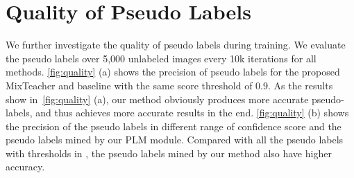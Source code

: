 \documentclass[10pt,twocolumn,letterpaper]{article}
\begin{document}
\begin{table*}[th]
    \centering
    
    \caption{Comparison with state-of-the-art methods on COCO benchmark.  on \texttt{val2017} set are reported.
    Under the {Partially Labeled} setting, results are the average of all five folds and numbers behind  indicate the standard deviation. Under the {Additional} setting, numbers in front of the arrow indicate the supervised baseline. 
    The views of unlabeled image used in each iteration are reported as well.
    }
    \label{tab:sota_coco}
    
\end{table*}



\section{Quality of Pseudo Labels}

We further investigate the quality of pseudo labels during training. We evaluate the pseudo labels over 5,000 unlabeled images every 10k iterations for all methods. \cref{fig:quality} (a) shows the precision of pseudo labels for the proposed MixTeacher and baseline with the same score threshold of 0.9.  As the results show in~\ref{fig:quality} (a), our method obviously produces more accurate pseudo-labels, and thus achieves more accurate results in the end. \cref{fig:quality} (b) shows the precision of the pseudo labels in different range of confidence score and the pseudo labels mined by our PLM module. Compared with all the pseudo labels with thresholds in , the pseudo labels mined by our method also have higher accuracy.
\end{document}
